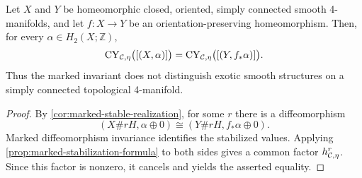 \begin{corollary}
\label{cor:no-simply-connected-exotic-detection}
Let $X$ and $Y$ be homeomorphic closed, oriented, simply connected smooth
4-manifolds, and let $f\colon X\to Y$ be an orientation-preserving
homeomorphism.  Then, for every $\alpha\in H_2(X;\mathbb Z)$,
\[
  \operatorname{CY}_{\mathcal{C},\eta}\bigl([(X,\alpha)]\bigr)
  =\operatorname{CY}_{\mathcal{C},\eta}\bigl([(Y,f_*\alpha)]\bigr).
\]
Thus the marked invariant does not distinguish exotic smooth structures on
a simply connected topological 4-manifold.
\end{corollary}

\begin{proof}
By \cref{cor:marked-stable-realization}, for some $r$ there is a
diffeomorphism
\[
  (X\#rH,\alpha\oplus0)
  \cong(Y\#rH,f_*\alpha\oplus0).
\]
Marked diffeomorphism invariance identifies the stabilized values.  Applying
\cref{prop:marked-stabilization-formula} to both sides gives a common factor
$h_{\mathcal{C},\eta}^{r}$.  Since this factor is nonzero, it cancels and yields
the asserted equality.
\end{proof}
